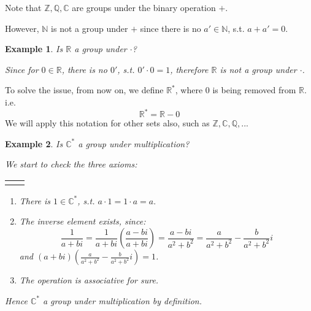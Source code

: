 \documentclass{article}
\theoremstyle{MyNonumberplain}
\theoremstyle{break}
\newcommand{\R}{\mathbb{R}}
\newcommand{\Q}{\mathbb{Q}}
\newcommand{\Z}{\mathbb{Z}}
\newcommand{\N}{\mathbb{N}}
\newcommand{\C}{\mathbb{C}}
\theoremstyle{break}
\newtheorem{example}{Example}[section]
\theoremstyle{break}
\theoremstyle{definition}
\theoremstyle{break}
\begin{document}
Note that $\Z,\Q,\C$ are groups under the binary operation $+$.

However, $\N$ is not a group under $+$ since there is no $a'\in\N$, s.t. $a+a'=0$.

\begin{expbox}
    \begin{example}
        Is $\R$ a group under $\cdot$?
        \begin{ansbox}
            Since for $0\in\R$, there is no $0'$, s.t. $0'\cdot 0=1$, therefore $\R$ is not a group under $\cdot$.
        \end{ansbox}
    \end{example}
\end{expbox}

To solve the issue, from now on, we define $\R^*$, where $0$ is being removed from $\R$. i.e. 
$$\R^*=\R-{0}$$
We will apply this notation for other sets also, such as $\Z,\C,\Q,...$

\begin{expbox}
    \begin{example}
        Is $\C^*$ a group under multiplication?
        \begin{ansbox}
            We start to check the three axioms:

            \begin{tabular}{ll}
                &\\
            \end{tabular}
    
            \begin{enumerate}
                \item There is $1\in \C^*$, s.t. $a\cdot 1=1\cdot a=a.$\bigskip
                \item The inverse element exists, since:
                $$\frac{1}{a+bi}=\frac{1}{a+bi}\left(\frac{a-bi}{a+bi}\right)=\frac{a-bi}{a^2+b^2}=\frac{a}{a^2+b^2}-\frac{b}{a^2+b^2}i$$
                and $(a+bi)\left( \frac{a}{a^2+b^2}-\frac{b}{a^2+b^2}i\right)=1$.\bigskip
                \item The operation is associative for sure.\bigskip
            \end{enumerate}

            Hence $\C^*$ a group under multiplication by definition.
    
        \end{ansbox}
    \end{example}
\end{expbox}
\end{document}
